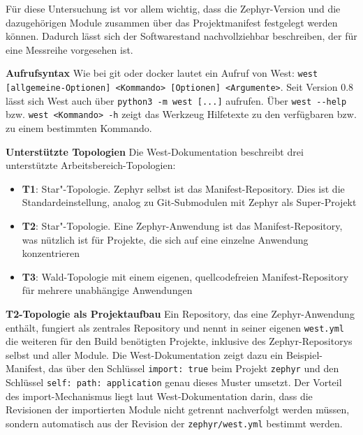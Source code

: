 F{\"u}r diese Untersuchung ist vor allem wichtig, dass die Zephyr-Version und die dazugeh{\"o}rigen Module zusammen {\"u}ber das Projektmanifest festgelegt werden k{\"o}nnen. Dadurch l{\"a}sst sich der Softwarestand nachvollziehbar beschreiben, der f{\"u}r eine Messreihe vorgesehen ist.

\textbf{Aufrufsyntax} Wie bei git oder docker lautet ein Aufruf von West: \lstinline[style=fileinline]|west [allgemeine-Optionen] <Kommando> [Optionen] <Argumente>|. Seit Version 0.8 l{\"a}sst sich West auch {\"u}ber \lstinline[style=fileinline]|python3 -m west [...]| aufrufen. {\"U}ber \lstinline[style=fileinline]|west --help| bzw. \lstinline[style=fileinline]|west <Kommando> -h| zeigt das Werkzeug Hilfetexte zu den verf{\"u}gbaren bzw. zu einem bestimmten Kommando.

\textbf{Unterst{\"u}tzte Topologien} Die West-Dokumentation beschreibt drei unterst{\"u}tzte Arbeitsbereich-Topologien:

\begin{itemize}
\item \textbf{T1}: \glqq{}Star"-Topologie. Zephyr selbst ist das Manifest-Repository. Dies ist die Standardeinstellung, analog zu Git-Submodulen mit Zephyr als Super-Projekt
\item \textbf{T2}: \glqq{}Star"-Topologie. Eine Zephyr-Anwendung ist das Manifest-Repository, was n{\"u}tzlich ist f{\"u}r Projekte, die sich auf eine einzelne Anwendung konzentrieren
\item \textbf{T3}: Wald-Topologie mit einem eigenen, quellcodefreien Manifest-Repository f{\"u}r mehrere unabh{\"a}ngige Anwendungen
\end{itemize}
\textbf{T2-Topologie als Projektaufbau} Ein Repository, das eine Zephyr-Anwendung enth{\"a}lt, fungiert als zentrales Repository und nennt in seiner eigenen \lstinline[style=fileinline]|west.yml| die weiteren f{\"u}r den Build ben{\"o}tigten Projekte, inklusive des Zephyr-Repositorys selbst und aller Module. Die West-Dokumentation zeigt dazu ein Beispiel-Manifest, das {\"u}ber den Schl{\"u}ssel \lstinline[style=fileinline]|import: true| beim Projekt \lstinline[style=fileinline]|zephyr| und den Schl{\"u}ssel \lstinline[style=fileinline]|self: path: application| genau dieses Muster umsetzt. Der Vorteil des import-Mechanismus liegt laut West-Dokumentation darin, dass die Revisionen der importierten Module nicht getrennt nachverfolgt werden m{\"u}ssen, sondern automatisch aus der Revision der \lstinline[style=fileinline]|zephyr/west.yml| bestimmt werden.

